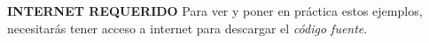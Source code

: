 \textbf{INTERNET REQUERIDO}
Para ver y poner en práctica estos ejemplos, necesitarás tener acceso a internet para descargar el \textit{código fuente}.



